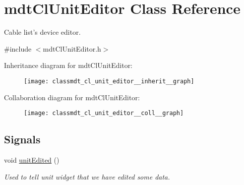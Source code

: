 \hypertarget{classmdt_cl_unit_editor}{\section{mdt\-Cl\-Unit\-Editor Class Reference}
\label{classmdt_cl_unit_editor}
}


Cable list's device editor.  




{\ttfamily \#include $<$mdt\-Cl\-Unit\-Editor.\-h$>$}



Inheritance diagram for mdt\-Cl\-Unit\-Editor\-:\nopagebreak
\begin{figure}[H]
\begin{center}
\leavevmode
\texttt{[image: classmdt\_cl\_unit\_editor\_\_inherit\_\_graph]}
\end{center}
\end{figure}


Collaboration diagram for mdt\-Cl\-Unit\-Editor\-:\nopagebreak
\begin{figure}[H]
\begin{center}
\leavevmode
\texttt{[image: classmdt\_cl\_unit\_editor\_\_coll\_\_graph]}
\end{center}
\end{figure}
\subsection*{Signals}
\begin{DoxyCompactItemize}
\item 
void \hyperlink{classmdt_cl_unit_editor_a229445497d158436289db1c87b38009b}{unit\-Edited} ()
\begin{DoxyCompactList}\small\item\em Used to tell unit widget that we have edited some data. \end{DoxyCompactList}\end{DoxyCompactItemize}
